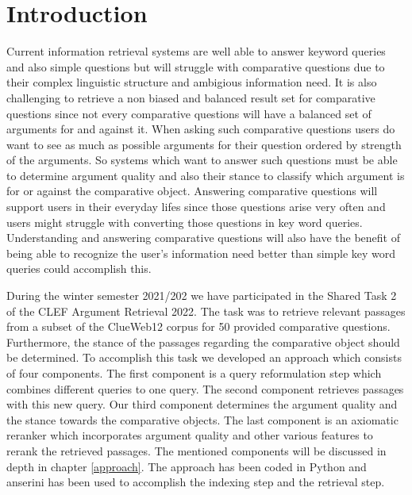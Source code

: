 \section{Introduction}
    Current information retrieval systems are well able to answer keyword queries and also simple questions but will struggle with comparative questions due to their complex linguistic structure and ambigious information need.  It is also challenging to retrieve  a non biased and balanced result set for comparative questions since not every comparative questions will have a balanced set of arguments for and against it. When asking such comparative questions users do want to see as much as possible arguments for their question  ordered by strength of the arguments. So systems which want to answer such questions must be able to determine argument quality and also their stance to classify which argument is for or against the comparative object.
    Answering comparative questions will support users in their everyday lifes since those questions arise very often and users might struggle with converting those questions in key word queries. Understanding and answering comparative questions will also have the benefit of being able to recognize the user's information need better than simple key word queries could accomplish this. 
    \par
    During the winter semester 2021/202 we have participated in the Shared Task 2 of the CLEF Argument Retrieval 2022. The task was to retrieve relevant passages from a subset of the ClueWeb12 corpus for 50 provided comparative questions. Furthermore, the stance of the passages regarding the comparative object should be determined. To accomplish this task we developed an approach which consists of four components. The first component is a query reformulation step which combines different queries to one query. The second component retrieves passages with this new query. Our third component determines the argument quality and the stance towards the comparative objects. The last component is an axiomatic reranker which incorporates argument quality and other various features to rerank the retrieved passages. The mentioned components will be discussed in depth in chapter \ref{approach}. The approach has been coded in Python and anserini has been used to accomplish the indexing step and the retrieval step.   